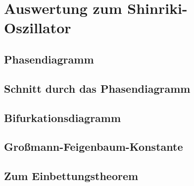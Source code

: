 \section{Auswertung zum Shinriki-Oszillator}

\subsection{Phasendiagramm}


\subsection{Schnitt durch das Phasendiagramm}


\subsection{Bifurkationsdiagramm}


\subsection{Großmann-Feigenbaum-Konstante}


\subsection{Zum Einbettungstheorem}